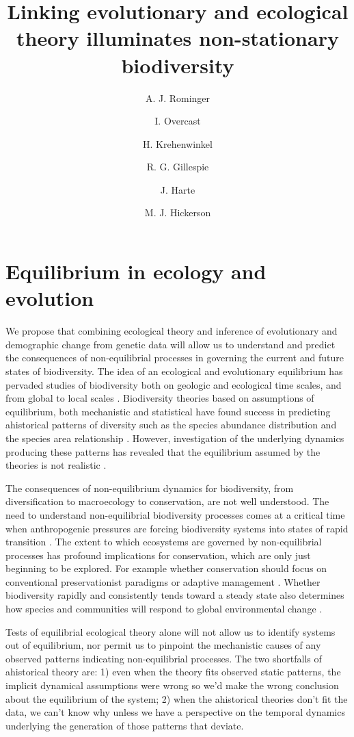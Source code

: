 \documentclass[12pt]{article}
\title{Linking evolutionary and ecological theory illuminates
  non-stationary biodiversity}
\author[1, 2]{A. J. Rominger}
\author[3]{I. Overcast}
\author[1]{H. Krehenwinkel}
\author[1]{R. G. Gillespie}
\author[1, 4]{J. Harte}
\author[3]{M. J. Hickerson}
\affil[1]{Department of Environmental Science, Policy and Management,
  University of California, Berkeley}
\affil[2]{Santa Fe Institute}
\affil[3]{Biology Department, City College of New York}
\affil[4]{Energy and Resource Group, University of California, Berkeley}
\date{}
\begin{document}
\maketitle
\pagebreak

\section{Equilibrium in ecology and evolution}

We propose that combining ecological theory and inference of
evolutionary and demographic change from genetic data will allow us to
understand and predict the consequences of non-equilibrial processes
in governing the current and future states of biodiversity. The idea
of an ecological and evolutionary equilibrium has pervaded studies of
biodiversity both on geologic and ecological time scales, and from
global to local scales \cite{Sepkoski1984-kv, Alroy2010-lv,
  Rabosky2008-ej, Rabosky2009-gs, Hubbell2001-dx, Harte2011-um,
  Chesson2000-uc, Adler2010-ad, Tilman2004-xt}. Biodiversity theories
based on assumptions of equilibrium, both mechanistic
\cite{Hubbell2001-dx, Chesson2000-uc, Tilman2004-xt} and statistical
\cite{Harte2011-um, Pueyo2007-iq, Shipley2006-sx} have found success
in predicting ahistorical patterns of diversity such as the species
abundance distribution \cite{White2012-yw,Hubbell2001-dx,Harte2011-um}
and the species area relationship
\cite{Hubbell2001-dx,Harte2011-um}. However, investigation of the
underlying dynamics producing these patterns has revealed that the
equilibrium assumed by the theories is not realistic
\cite{Ricklefs2006-tn}.

The consequences of non-equilibrium dynamics for biodiversity, from
diversification to macroecology to conservation, are not well
understood. The need to understand non-equilibrial biodiversity
processes comes at a critical time when anthropogenic pressures are
forcing biodiversity systems into states of rapid transition
\cite{Barnosky2012-qz}. The extent to which ecosystems are governed by
non-equilibrial processes has profound implications for conservation,
which are only just beginning to be explored. For example whether
conservation should focus on conventional preservationist paradigms or
adaptive management \cite{Wallington2005-kv}. Whether biodiversity
rapidly and consistently tends toward a steady state also determines
how species and communities will respond to global environmental
change \cite{Barnosky2012-qz}.

Tests of equilibrial ecological theory alone will not allow us to
identify systems out of equilibrium, nor permit us to pinpoint the
mechanistic causes of any observed patterns indicating non-equilibrial
processes. The two shortfalls of ahistorical theory are: 1) even when
the theory fits observed static patterns, the implicit dynamical
assumptions were wrong so we'd make the wrong conclusion about the
equilibrium of the system; 2) when the ahistorical theories don't fit
the data, we can't know why unless we have a perspective on the temporal
dynamics underlying the generation of those patterns that deviate.
\end{document}
